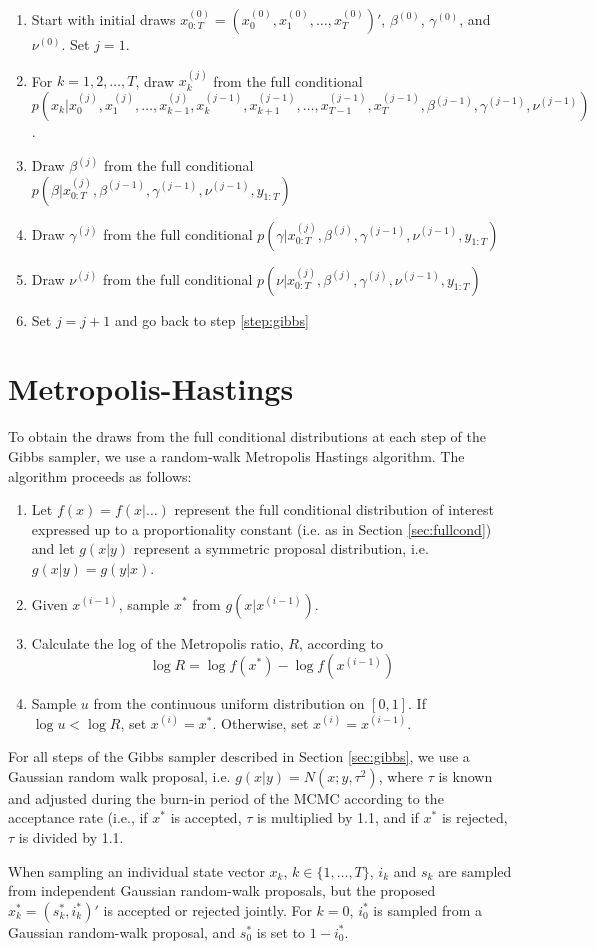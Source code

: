 \documentclass{article}
\begin{document}
\begin{enumerate}
\item Start with initial draws $x^{(0)}_{0:T} = (x^{(0)}_0,x^{(0)}_1,\ldots,x^{(0)}_T)'$, $\beta^{(0)}$, $\gamma^{(0)}$, and $\nu^{(0)}$. Set $j = 1$.
\item \label{step:gibbs} For $k = 1, 2, \ldots, T$, draw $x^{(j)}_k$ from the full conditional \[p(x_k|x^{(j)}_0,x^{(j)}_1,\ldots,x^{(j)}_{k-1},x^{(j-1)}_k,x^{(j-1)}_{k+1},\ldots,x^{(j-1)}_{T-1},x^{(j-1)}_T,\beta^{(j-1)},\gamma^{(j-1)},\nu^{(j-1)})\].
\item Draw $\beta^{(j)}$ from the full conditional $p(\beta|x^{(j)}_{0:T},\beta^{(j-1)},\gamma^{(j-1)},\nu^{(j-1)},y_{1:T})$
\item Draw $\gamma^{(j)}$ from the full conditional $p(\gamma|x^{(j)}_{0:T},\beta^{(j)},\gamma^{(j-1)},\nu^{(j-1)},y_{1:T})$
\item Draw $\nu^{(j)}$ from the full conditional $p(\nu|x^{(j)}_{0:T},\beta^{(j)},\gamma^{(j)},\nu^{(j-1)},y_{1:T})$
\item Set $j = j + 1$ and go back to step \ref{step:gibbs}
\end{enumerate}

\section{Metropolis-Hastings}
To obtain the draws from the full conditional distributions at each step of the Gibbs sampler, we use a random-walk Metropolis Hastings algorithm. The algorithm proceeds as follows:

\begin{enumerate}
\item Let $f(x) = f(x|\hdots)$ represent the full conditional distribution of interest expressed up to a proportionality constant (i.e. as in Section \ref{sec:fullcond}) and let $g(x|y)$ represent a symmetric proposal distribution, i.e. $g(x|y) = g(y|x)$.
\item Given $x^{(i-1)}$, sample $x^*$ from $g(x|x^{(i-1)})$.
\item Calculate the log of the Metropolis ratio, $R$, according to
\[\log R = \log f(x^*) - \log f(x^{(i-1)})\]
\item Sample $u$ from the continuous uniform distribution on $[0,1]$. If $\log u < \log R$, set $x^{(i)} = x^*$. Otherwise, set $x^{(i)} = x^{(i-1)}$.
\end{enumerate}

\noindent For all steps of the Gibbs sampler described in Section \ref{sec:gibbs}, we use a Gaussian random walk proposal, i.e. $g(x|y) = N(x;y,\tau^2)$, where $\tau$ is known and adjusted during the burn-in period of the MCMC according to the acceptance rate (i.e., if $x^*$ is accepted, $\tau$ is multiplied by 1.1, and if $x^*$ is rejected, $\tau$ is divided by 1.1.

When sampling an individual state vector $x_k$, $k \in \{1,\ldots,T\}$, $i_k$ and $s_k$ are sampled from independent Gaussian random-walk proposals, but the proposed $x^*_k = (s^*_k,i^*_k)'$ is accepted or rejected jointly. For $k = 0$, $i^*_0$ is sampled from a Gaussian random-walk proposal, and $s^*_0$ is set to $1 - i^*_0$.
\end{document}
